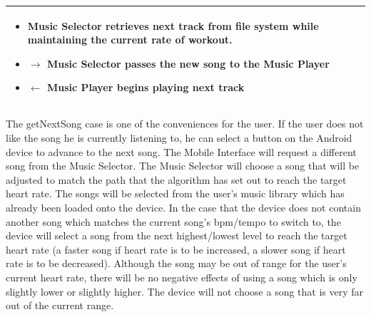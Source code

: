 \documentclass[letterpaper,english, 12pt]{scrreprt}
\begin{document}
\begin{center}
\begin{tabular}{|C{15cm}|}
\begin{itemize}
                                        \item Music Selector retrieves next track from file system while maintaining the current rate of workout.
					\item $\rightarrow$ Music Selector passes the new song to the Music Player
                                        \item $\leftarrow$ Music Player begins playing next track
                                \end{itemize}
				\\
                \hline
        \end{tabular}
\end{center}

The getNextSong case is one of the conveniences for the user. If the user does not like the song he is currently listening to, he can select a button on the Android device to advance to the next song. The Mobile Interface will request a different song from the Music Selector. The Music Selector will choose a song that will be adjusted to match the path that the algorithm has set out to reach the target heart rate. The songs will be selected from the user's music library which has already been loaded onto the device. In the case that the device does not contain another song which matches the current song's bpm/tempo to switch to, the device will select a song from the next highest/lowest level to reach the target heart rate (a faster song if heart rate is to be increased, a slower song if heart rate is to be decreased). Although the song may be out of range for the user's current heart rate, there will be no negative effects of using a song which is only slightly lower or slightly higher. The device will not choose a song that is very far out of the current range. 
\end{document}
